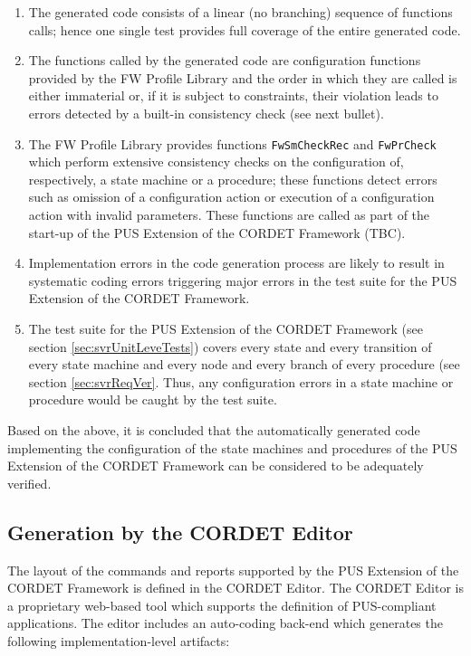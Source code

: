 \documentclass{pnp_article}
\begin{document}
\begin{enumerate}
\item The generated code consists of a linear (no branching) sequence of functions calls; hence one single test provides full coverage of the entire generated code.
\item The functions called by the generated code are configuration functions provided by the FW Profile Library and the order in which they are called is either immaterial or, if it is subject to constraints, their violation leads to errors detected by a built-in consistency check (see next bullet).
\item The FW Profile Library provides functions \texttt{FwSmCheckRec} and \texttt{FwPrCheck} which perform extensive consistency checks on the configuration of, respectively, a state machine or a procedure; these functions detect errors such as omission of a configuration action or execution of a configuration action with invalid parameters. These functions are called as part of the start-up of the PUS Extension of the CORDET Framework (TBC).
\item Implementation errors in the code generation process are likely to result in systematic coding errors triggering major errors in the test suite for the PUS Extension of the CORDET Framework.
\item The test suite for the PUS Extension of the CORDET Framework (see section \ref{sec:svrUnitLeveTests}) covers every state and every transition of every state machine and every node and every branch of every procedure (see section \ref{sec:svrReqVer}. Thus, any configuration errors in a state machine or procedure would be caught by the test suite.
\end{enumerate}

Based on the above, it is concluded that the automatically generated code implementing the configuration of the state machines and procedures of the PUS Extension of the CORDET Framework can be considered to be adequately verified.

\subsection{Generation by the CORDET Editor}
The layout of the commands and reports supported by the PUS Extension of the CORDET Framework is defined in the CORDET Editor. The CORDET Editor is a proprietary web-based tool which supports the definition of PUS-compliant applications. The editor includes an auto-coding back-end which generates the following implementation-level artifacts:
\end{document}
